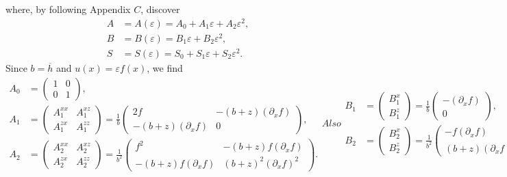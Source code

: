 where, by following Appendix $C$, discover
\begin{align*}
A&=A(\varepsilon)=A_0+A_1\varepsilon+A_2\varepsilon^2,\\
B&=B(\varepsilon)=B_1\varepsilon+B_2\varepsilon^2,\\
S&=S(\varepsilon)=S_0+S_1\varepsilon + S_2\varepsilon^2.
\end{align*}
Since $b=\overline{h}$ and $u(x)=\varepsilon f(x)$, we find
\begin{subequations}
\begin{align}
A_0&=\begin{pmatrix}
    1 & 0\\
    0 & 1
  \end{pmatrix},\\
A_1&=\begin{pmatrix}
    A_1^{xx} & A_1^{xz}\\
    A_1^{zx} & A_1^{zz}
  \end{pmatrix}=\frac{1}{b}
  \begin{pmatrix}
    2f & -(b+z)(\partial_x f)\\
    -(b+z)(\partial_x f) & 0
  \end{pmatrix},\\
A_2&=\begin{pmatrix}
    A_2^{xx} & A_2^{xz}\\
    A_2^{zx} & A_2^{zz}
  \end{pmatrix}=\frac{1}{b^2}
  \begin{pmatrix}
    f^2 & -(b+z)f(\partial_x f)\\
    -(b+z)f(\partial_x f) & (b+z)^2(\partial_x f)^2
  \end{pmatrix}.
  \end{align}
Also
\begin{align}
B_1&=\begin{pmatrix} B_1^x \\ B_1^z\end{pmatrix}=
\frac{1}{b}\begin{pmatrix} -(\partial_x f) \\0\end{pmatrix},\\
B_2&=\begin{pmatrix} B_2^x \\ B_2^z\end{pmatrix}=
\frac{1}{b^2}\begin{pmatrix} -f(\partial_x f) \\(b+z)(\partial_x f)^2\end{pmatrix},
\end{align}
and
\begin{align}
S_0&=1,\quad 
S_1=\frac{2}{b}f,\quad
S_2=\frac{1}{b^2}f^2.
\end{align}
\end{subequations}
